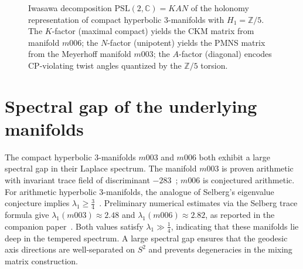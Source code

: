\documentclass[12pt]{article}
\theoremstyle{definition}
\begin{document}
\begin{figure}[htbp]
\centering
{}
\caption{Iwasawa decomposition $\mathrm{PSL}(2,\mathbb{C})=KAN$ of the
holonomy representation of compact hyperbolic 3-manifolds with
$H_1=\mathbb{Z}/5$. The $K$-factor (maximal compact) yields the CKM
matrix from manifold $m006$; the $N$-factor (unipotent) yields the
PMNS matrix from the Meyerhoff manifold $m003$; the $A$-factor
(diagonal) encodes CP-violating twist angles quantized by the
$\mathbb{Z}/5$ torsion.}
\label{fig:kan}
\end{figure}

\section{Spectral gap of the underlying manifolds}
\label{sec:spectral}

The compact hyperbolic 3-manifolds $m003$ and $m006$ both exhibit a
large spectral gap in their Laplace spectrum.
The manifold $m003$ is proven arithmetic with invariant trace field
of discriminant $-283$~\cite{Chinburg98}; $m006$ is conjectured arithmetic.
For arithmetic hyperbolic 3-manifolds, the analogue of Selberg's
eigenvalue conjecture implies $\lambda_1 \geq \tfrac{3}{4}$~\cite{Sarnak}.
Preliminary numerical estimates via the Selberg trace formula give
$\lambda_1(m003) \approx 2.48$ and $\lambda_1(m006) \approx 2.82$,
as reported in the companion paper~\cite{Gentry:Twist}.
Both values satisfy $\lambda_1 \gg \tfrac{1}{4}$, indicating that
these manifolds lie deep in the tempered spectrum.
A large spectral gap ensures that the geodesic axis directions are
well-separated on $S^2$ and prevents degeneracies in the mixing
matrix construction.
\end{document}
